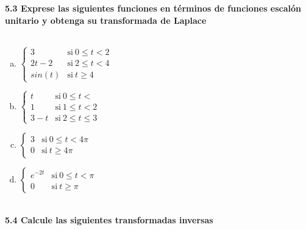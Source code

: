 \documentclass[11pt]{article}
\begin{document}
\textbf{5.3 Exprese las siguientes funciones en términos de funciones escalón unitario y obtenga su transformada de Laplace \\ \\}
\begin{enumerate}[(a)]
\item  $\left\{
	       \begin{array}{ll}
		 3      & \mathrm{si\ }  0\leq t <2\\
		 2t-2 & \mathrm{si\ }   2\leq t <4\\
		sin(t) & \mathrm{si\ }  t\geq 4
	       \end{array}\right.$ \\
\item  $\left\{
	       \begin{array}{ll}
		 t      & \mathrm{si\ }  0\leq t <\\
		 1 & \mathrm{si\ }   1\leq t <2\\
		3-t & \mathrm{si\ }  2 \leq t\leq 3
	       \end{array}\right.$ \\
\item  $\left\{
	       \begin{array}{ll}
		 3      & \mathrm{si\ }  0\leq t <4\pi\\
		 0 		& \mathrm{si\ }  t\geq 4\pi
	
	       \end{array}\right.$
\item  $\left\{
	       \begin{array}{ll}
		e^{-2t}      & \mathrm{si\ }  0\leq t <\pi\\
		 0 		& \mathrm{si\ }  t\geq \pi
	
	       \end{array}\right.$
	      \\ \\
\end{enumerate}
\textbf{5.4 Calcule las siguientes transformadas inversas}
\end{document}

